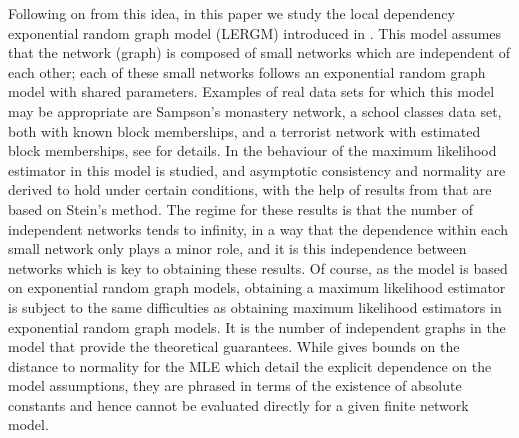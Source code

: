 \documentclass{article}
\begin{document}
Following on from this idea, in this paper we study the local dependency exponential random graph model (LERGM) introduced in \cite{schweinberger2015local}. This model assumes that the network (graph) is composed of small networks which are independent of each other; each of these small networks follows an exponential random graph model with shared parameters. Examples of real data sets for which this model may be appropriate are Sampson's monastery network, a school classes data set, both with known block memberships, and a terrorist network with estimated block memberships, see  \cite{stewart2026rates} for details. In   \cite{stewart2026rates} the behaviour of the maximum likelihood estimator in this model is studied, and  asymptotic consistency and normality are derived to hold under certain conditions, with the help of results from \cite{raivc2019multivariate} that are based on Stein's method. 
The regime for these results is that the number of independent networks tends to infinity, in a way that the dependence within each small network only plays a minor role, and it is this independence between networks which is key to obtaining these results. Of course, as the model is based on exponential random graph models, obtaining a maximum likelihood estimator is subject to the same difficulties as obtaining maximum likelihood estimators in exponential random graph models. It is the number of independent graphs in the model that provide the theoretical guarantees. While \cite{stewart2026rates} gives bounds on the distance to normality for the MLE which detail the explicit dependence on the model assumptions, they are phrased in terms of the existence of absolute constants and hence cannot be evaluated directly for a given finite network model.
\end{document}
